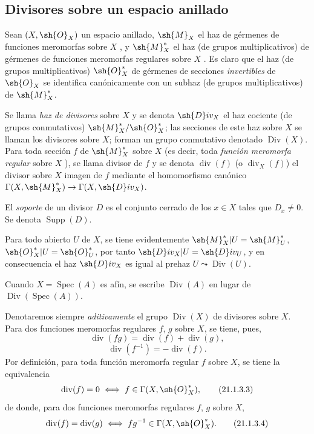 \subsection{Divisores sobre un espacio anillado}
\label{subsection:IV.21.1}
\label{IV.21.1}

\begin{env}[21.1.1]
\label{IV.21.1.1}
Sean $(X,\sh{O}_X)$ un espacio anillado, $\sh{M}_X$ el haz de gérmenes de funciones meromorfas sobre $X$ , y $\sh{M}_X^*$ el haz (de grupos multiplicativos) de gérmenes de funciones meromorfas regulares sobre $X$ .
Es claro que el haz (de grupos multiplicativos) $\sh{O}_X^*$ de gérmenes de secciones \emph{invertibles} de $\sh{O}_X$ se identifica canónicamente con un subhaz (de grupos multiplicativos) de $\sh{M}_X^*$.
\end{env}

\begin{definition}[21.1.2]
\label{IV.21.1.2}
Se llama \emph{haz de divisores} sobre $X$ y se denota $\sh{D}iv_X$ el haz cociente (de grupos conmutativos) $\sh{M}_X^*/\sh{O}_X^*$;
las secciones de este haz sobre $X$ se llaman los divisores sobre $X$; forman un grupo conmutativo denotado $\operatorname{Div}(X)$.
Para toda sección $f$ de $\sh{M}_X^*$ sobre $X$ \textup{(es decir, toda \emph{función meromorfa regular} sobre $X$ )}, se llama divisor de $f$ y se denota $\operatorname{div}(f)$ \textup{(o $\operatorname{div}_X(f)$)} el divisor sobre $X$ imagen de $f$ mediante el homomorfismo canónico
$\Gamma(X,\sh{M}_X^*)\to\Gamma(X,\sh{D}iv_X)$.
\end{definition}


El \emph{soporte} de un divisor $D$ es el conjunto cerrado de los $x\in X$ tales que $D_x\neq0$.
Se denota $\operatorname{Supp}(D)$.

Para todo abierto $U$ de $X$, se tiene evidentemente $\sh{M}_X^*|U=\sh{M}_U^*$, $\sh{O}_X^*|U=\sh{O}_U^*$, por tanto $\sh{D}iv_X|U=\sh{D}iv_U$, y en consecuencia el haz $\sh{D}iv_X$ es igual al prehaz $U\leadsto\operatorname{Div}(U)$.

Cuando $X=\operatorname{Spec}(A)$ es afín, se escribe $\operatorname{Div}(A)$ en lugar de $\operatorname{Div}(\operatorname{Spec}(A))$.

\begin{env}[21.1.3]
\label{IV.21.1.3}
Denotaremos siempre \emph{aditivamente} el grupo $\operatorname{Div}(X)$ de divisores sobre $X$.
Para dos funciones meromorfas regulares $f$, $g$ sobre $X$, se tiene, pues,
\[
\label{IV.21.1.3.1}
  \operatorname{div}(fg)=\operatorname{div}(f)+\operatorname{div}(g),
  \tag{21.1.3.1}
\]
\[
\label{IV.21.1.3.2}
  \operatorname{div}(f^{-1})=-\operatorname{div}(f).
  \tag{21.1.3.2}
\]
Por definición, para toda función meromorfa regular $f$ sobre $X$, se tiene la equivalencia
\[
\label{IV.21.1.3.3}
  \operatorname{div}(f)=0 \iff f\in\Gamma(X,\sh{O}_X^*),
  \tag{21.1.3.3}
\]
de donde, para dos funciones meromorfas regulares $f$, $g$ sobre $X$,
\[
\label{IV.21.1.3.4}
  \operatorname{div}(f)=\operatorname{div}(g) \iff fg^{-1}\in\Gamma(X,\sh{O}_X^*).
  \tag{21.1.3.4}
\]
\end{env}


